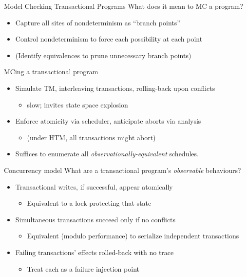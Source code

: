 \documentclass[xcolor=dvipsnames]{beamer}
\begin{document}
\begin{frame}{Model Checking Transactional Programs}
	What does it mean to MC a program?
	\begin{itemize}
		\item Capture all sites of nondeterminism as ``branch points'' %
		\item Control nondeterminism to force each possibility at each point
		\item (Identify equivalences to prune unnecessary branch points)
	\end{itemize}
	\pause
	\linegap

	MCing a transactional program
	\begin{itemize}
		\item Simulate TM, interleaving transactions, rolling-back upon conflicts
			\begin{itemize}
				\item slow; invites state space explosion
			\end{itemize}
		\item Enforce atomicity via scheduler, anticipate aborts via analysis
			\begin{itemize}
				\item (under HTM, all transactions might abort)
			\end{itemize}
		\item Suffices to enumerate all {\em observationally-equivalent} schedules.
	\end{itemize}
\end{frame}

\begin{frame}{Concurrency model}
	What are a transactional program's {\em observable} behaviours?
	\begin{itemize}
		\item Transactional writes, if successful, appear atomically %
		\begin{itemize}
			\item Equivalent to a lock protecting that state
		\end{itemize}
			\pause
		\item Simultaneous transactions succeed only if no conflicts
		\begin{itemize}
			\item Equivalent (modulo performance) to serialize independent transactions
		\end{itemize}
			\pause
		\item Failing transactions' effects rolled-back with no trace
		\begin{itemize}
			\item Treat each \xbegin as a failure injection point
		\end{itemize}
	\end{itemize}
\end{frame}
\end{document}
